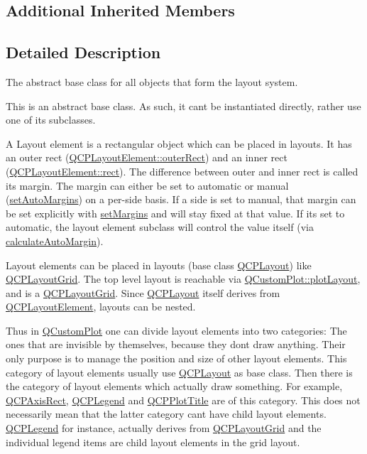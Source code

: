 \subsection*{Additional Inherited Members}


\subsection{Detailed Description}
The abstract base class for all objects that form the layout system. 

This is an abstract base class. As such, it can\textquotesingle{}t be instantiated directly, rather use one of its subclasses.

A Layout element is a rectangular object which can be placed in layouts. It has an outer rect (\hyperlink{class_q_c_p_layout_element_a60bbddee2d1230c2414bd776f44d17b8}{Q\+C\+P\+Layout\+Element\+::outer\+Rect}) and an inner rect (\hyperlink{class_q_c_p_layout_element_affdfea003469aac3d0fac5f4e06171bc}{Q\+C\+P\+Layout\+Element\+::rect}). The difference between outer and inner rect is called its margin. The margin can either be set to automatic or manual (\hyperlink{class_q_c_p_layout_element_accfda49994e3e6d51ed14504abf9d27d}{set\+Auto\+Margins}) on a per-\/side basis. If a side is set to manual, that margin can be set explicitly with \hyperlink{class_q_c_p_layout_element_a8f450b1f3f992ad576fce2c63d8b79cf}{set\+Margins} and will stay fixed at that value. If it\textquotesingle{}s set to automatic, the layout element subclass will control the value itself (via \hyperlink{class_q_c_p_layout_element_a005c9f0fe84bc1591a2cf2c46fd477b4}{calculate\+Auto\+Margin}).

Layout elements can be placed in layouts (base class \hyperlink{class_q_c_p_layout}{Q\+C\+P\+Layout}) like \hyperlink{class_q_c_p_layout_grid}{Q\+C\+P\+Layout\+Grid}. The top level layout is reachable via \hyperlink{class_q_custom_plot_afd280d4d621ae64a106543a545c508d7}{Q\+Custom\+Plot\+::plot\+Layout}, and is a \hyperlink{class_q_c_p_layout_grid}{Q\+C\+P\+Layout\+Grid}. Since \hyperlink{class_q_c_p_layout}{Q\+C\+P\+Layout} itself derives from \hyperlink{class_q_c_p_layout_element}{Q\+C\+P\+Layout\+Element}, layouts can be nested.

Thus in \hyperlink{class_q_custom_plot}{Q\+Custom\+Plot} one can divide layout elements into two categories\+: The ones that are invisible by themselves, because they don\textquotesingle{}t draw anything. Their only purpose is to manage the position and size of other layout elements. This category of layout elements usually use \hyperlink{class_q_c_p_layout}{Q\+C\+P\+Layout} as base class. Then there is the category of layout elements which actually draw something. For example, \hyperlink{class_q_c_p_axis_rect}{Q\+C\+P\+Axis\+Rect}, \hyperlink{class_q_c_p_legend}{Q\+C\+P\+Legend} and \hyperlink{class_q_c_p_plot_title}{Q\+C\+P\+Plot\+Title} are of this category. This does not necessarily mean that the latter category can\textquotesingle{}t have child layout elements. \hyperlink{class_q_c_p_legend}{Q\+C\+P\+Legend} for instance, actually derives from \hyperlink{class_q_c_p_layout_grid}{Q\+C\+P\+Layout\+Grid} and the individual legend items are child layout elements in the grid layout. 

